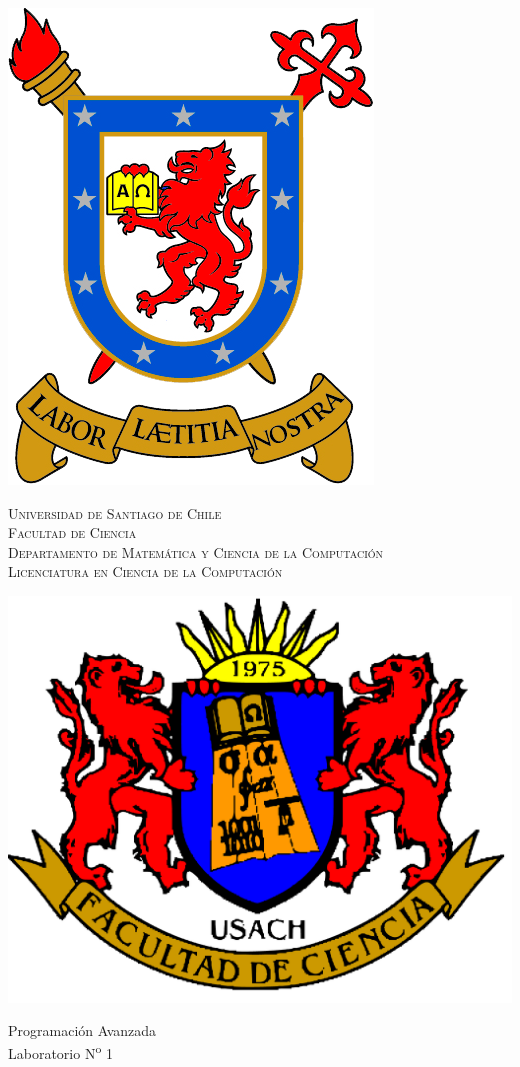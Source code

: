 \begin{titlepage}
		\begin{center}
        	\begin{center}
              \noindent%
              \includegraphics[height=0.1\textwidth]{usach.png}%
              \begin{minipage}[b]{0.7\textwidth}
              \centering
              {\textsc{Universidad de Santiago de Chile\\
              Facultad de Ciencia\\
              Departamento de Matemática y Ciencia de la Computación\\
              Licenciatura en Ciencia de la Computación}}
              \end{minipage}%
              \includegraphics[height=0.1\textwidth]{fac_cie.png}

            \end{center}

			\vspace{\fill}

			{Programación Avanzada}\\
			{Laboratorio N\textsuperscript{o} 1}
            \vspace{\fill} 
		\end{center}
        

\end{titlepage}

